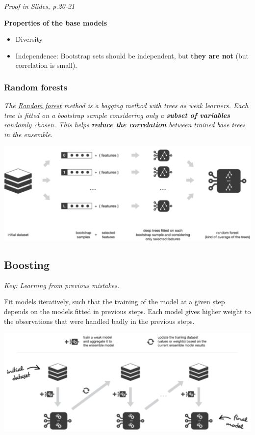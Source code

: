 \textit{Proof in Slides, p.20-21}


\textbf{Properties of the base models}
\begin{itemize}
	\item Diversity
	\item Independence: Bootstrap sets should be independent, but \textbf{they are not} (but correlation is small).
\end{itemize}



\subsubsection{Random forests}
\textit{The \href{https://towardsdatascience.com/ensemble-methods-bagging-boosting-and-stacking-c9214a10a205}{Random forest} method is a bagging method with trees as weak learners. Each tree is fitted on a bootstrap sample considering only a \textbf{subset of variables} randomly chosen. This helps \textbf{reduce the correlation} between trained base trees in the ensemble.
}
\begin{center}
	\includegraphics[width=\columnwidth]{images/9-random-forests}
\end{center}





\subsection{Boosting }
\textit{Key: Learning from previous mistakes.}

Fit models iteratively, such that the training of the model at a given step depends on the models fitted in previous steps. Each model gives higher weight to the observations that were handled badly in the previous steps.


\begin{center}
	\includegraphics[width=0\columnwidth]{images/9-boosting}
\end{center}


